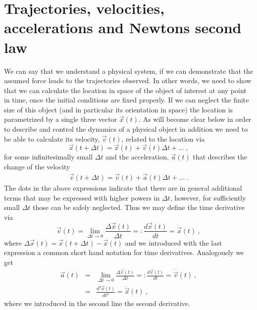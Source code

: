 \documentclass[12pt]{iopart}
\begin{document}
\section{Trajectories, velocities, accelerations and Newtons second law}
\label{sec:tva}

We can say that we understand a physical system, if we can demonstrate that the assumed force leads to the trajectories
observed. In other words, we need to show that we can calculate the location in space of the object of interest at any point
in time, once the initial conditions are fixed properly. If we can neglect the finite size of this object (and
in particular its orientation in space) the location is parametrized
by a single three vector $\vec x(t)$. As will become clear below in order to describe and control the dynamics of a physical
object in addition we need to be able to calculate its velocity, $\vec v(t)$, related to the location via
\begin{equation}\label{eq:x_update}
\vec x(t+\Delta t) = \vec x(t) + \vec v(t) \Delta t + ... \ , \label{eq:vdef}
\end{equation}
for some infinitesimally small $\Delta t$ and the acceleration, $\vec a(t)$ that describes the change of the velocity
\begin{eqnarray}\label{eq:v_update}
\vec v(t+\Delta t) = \vec v(t) + \vec a(t) \Delta t + ...\ . \label{eq:adef}
\end{eqnarray}
The dots in the above expressions indicate that there are in general additional terms that may be expressed with
higher powers in $\Delta t$, however, for sufficiently small $\Delta t$ those can be safely neglected.
Thus we may define the time derivative via
\begin{equation}
\vec v(t) = \lim_{\Delta t\to 0} \frac{\Delta \vec x(t)}{\Delta t} =: \frac{d\vec x(t)}{dt}  = \dot{\vec  x}(t) \ ,
\end{equation}
where $\Delta \vec x(t)=\vec x(t+\Delta t)-\vec x(t)$ and we introduced with the last expression a common short hand notation
for time derivatives. Analogously we get
\begin{eqnarray}
\vec a(t) &=& \lim_{\Delta t\to 0} \frac{\Delta \vec v(t)}{\Delta t} =: \frac{d\vec v(t)}{dt}  = \dot{\vec v}(t) \ , \\
 &=& \frac{d^2\vec x(t)}{dt^2}  = \ddot{\vec x}(t) \ ,
\end{eqnarray}
where we introduced in the second line the second derivative.
\end{document}

